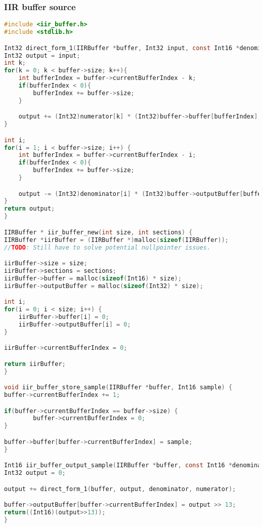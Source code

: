 \subsubsection{IIR buffer source}
\begin{lstlisting}[language=c]
#include <iir_buffer.h>
#include <stdlib.h>

Int32 direct_form_1(IIRBuffer *buffer, Int32 input, const Int16 *denominator, const Int16 *numerator) {
Int32 output = input;
int k;
for(k = 0; k < buffer->size; k++){
    int bufferIndex = buffer->currentBufferIndex - k;
    if(bufferIndex < 0){
        bufferIndex += buffer->size;
    }

    output += (Int32)numerator[k] * (Int32)buffer->buffer[bufferIndex];
}

int i;
for(i = 1; i < buffer->size; i++) {
    int bufferIndex = buffer->currentBufferIndex - i;
    if(bufferIndex < 0){
        bufferIndex += buffer->size;
    }

    output -= (Int32)denominator[i] * (Int32)buffer->outputBuffer[bufferIndex];
}
return output;
}

IIRBuffer * iir_buffer_new(int size, int sections) {
IIRBuffer *iirBuffer = (IIRBuffer *)malloc(sizeof(IIRBuffer));
//TODO: Still have to solve potential nullpointer issues.

iirBuffer->size = size;
iirBuffer->sections = sections;
iirBuffer->buffer = malloc(sizeof(Int16) * size);
iirBuffer->outputBuffer = malloc(sizeof(Int32) * size);

int i;
for(i = 0; i < size; i++) {
    iirBuffer->buffer[i] = 0;
    iirBuffer->outputBuffer[i] = 0;
}

iirBuffer->currentBufferIndex = 0;

return iirBuffer;
}

void iir_buffer_store_sample(IIRBuffer *buffer, Int16 sample) {
buffer->currentBufferIndex += 1;

if(buffer->currentBufferIndex == buffer->size) {
        buffer->currentBufferIndex = 0;
}

buffer->buffer[buffer->currentBufferIndex] = sample;
}

Int16 iir_buffer_output_sample(IIRBuffer *buffer, const Int16 *denominator, const Int16 *numerator) {
Int32 output = 0;

output += direct_form_1(buffer, output, denominator, numerator);

buffer->outputBuffer[buffer->currentBufferIndex] = output >> 13;
return((Int16)(output>>13));
}
\end{lstlisting}
\clearpage

